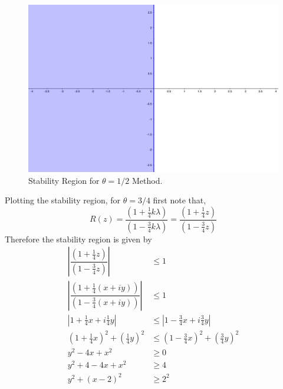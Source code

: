 \documentclass[12pt]{article}
\makeatletter
\theoremstyle{homework}
\newenvironment{exercise}[1]
{\def\@currentlabel{#1}\exercisecore}
{\endexercisecore}
\makeatother
\begin{document}
\begin{exercise}{Problem P30}
\begin{enumerate}
    \begin{figure}[H]
      \begin{center}
        \caption{Stability Region for $\theta = 1/2$ Method.}
        \includegraphics[width=.80\textwidth]{theta3.png}
      \end{center}
     \end{figure}




    Plotting the stability region, for $\theta = 3/4$ first note that,
    \begin{equation*}
      R(z) = \dfrac{(1 + \frac{1}{4}k\lambda)}{ (1 - \frac{3}{4} k\lambda) } = \dfrac{(1 + \frac{1}{4}z)}{ (1 - \frac{3}{4} z) }
    \end{equation*}
    Therefore the stability region is given by 
    \begin{align*}
      \left|\dfrac{(1 + \frac{1}{4}z)}{ (1 - \frac{3}{4} z) }\right| &\leq 1\\
      \left|\dfrac{(1 + \frac{1}{4}(x + iy))}{ (1 - \frac{3}{4}(x + iy)) }\right| &\leq 1\\
      \left|1 + \frac{1}{4}x + i\frac{1}{4}y\right| &\leq \left|1 - \frac{3}{4}x + i\frac{3}{4}y\right|\\
      (1 + \frac{1}{4}x)^2 + (\frac{1}{4}y)^2 &\leq (1 - \frac{3}{4}x)^2 + (\frac{3}{4}y)^2\\
      y^2 - 4x + x^2 &\geq 0\\
      y^2 + 4 - 4x + x^2 &\geq 4\\
      y^2 + (x - 2)^2 &\geq 2^2
    \end{align*}


\end{enumerate}
\end{exercise}
\end{document}
